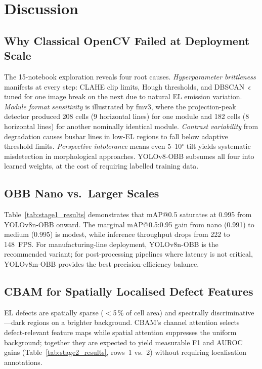 \documentclass[conference]{IEEEtran}
\begin{document}
\section{Discussion}
\label{sec:discussion}

\subsection{Why Classical OpenCV Failed at Deployment Scale}

The 15-notebook exploration reveals four root causes.
\textit{Hyperparameter brittleness} manifests at every step:
CLAHE clip limits, Hough thresholds, and DBSCAN~$\epsilon$
tuned for one image break on the next due to natural EL
emission variation.
\textit{Module format sensitivity} is illustrated by fmv3,
where the projection-peak detector produced 208 cells (9
horizontal lines) for one module and 182 cells (8 horizontal
lines) for another nominally identical module.
\textit{Contrast variability} from degradation causes busbar
lines in low-EL regions to fall below adaptive threshold
limits.
\textit{Perspective intolerance} means even 5--10$^\circ$
tilt yields systematic misdetection in morphological
approaches.
YOLOv8-OBB subsumes all four into learned weights, at the
cost of requiring labelled training data.

\subsection{OBB Nano vs.\ Larger Scales}

Table~\ref{tab:stage1_results} demonstrates that mAP@0.5
saturates at 0.995 from YOLOv8n-OBB onward. The marginal
mAP@0.5:0.95 gain from nano (0.991) to medium (0.995) is
modest, while inference throughput drops from 222 to
148~FPS. For manufacturing-line deployment, YOLOv8n-OBB
is the recommended variant; for post-processing pipelines
where latency is not critical, YOLOv8m-OBB provides the
best precision-efficiency balance.

\subsection{CBAM for Spatially Localised Defect Features}

EL defects are spatially sparse ($<$5\,\% of cell area)
and spectrally discriminative---dark regions on a brighter
background. CBAM's channel attention selects defect-relevant
feature maps while spatial attention suppresses the uniform
background; together they are expected to yield measurable
F1 and AUROC gains (Table~\ref{tab:stage2_results},
rows~1 vs.\ 2) without requiring localisation annotations.
\end{document}
